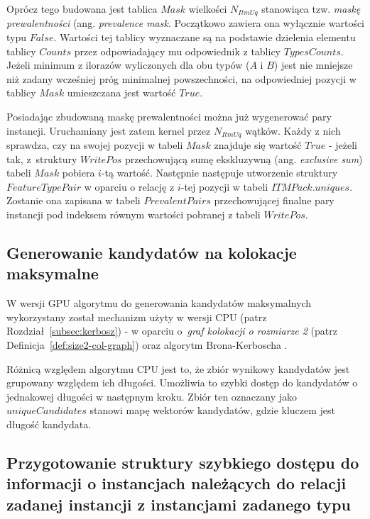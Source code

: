 \documentclass[12pt]{article}
\begin{document}
Oprócz tego budowana jest tablica $ Mask $ wielkości $ N_{ItmUq} $ stanowiąca tzw. \textit{maskę prewalentności} (ang. \textit{prevalence mask}. Początkowo zawiera ona wyłącznie wartości typu $ False $. Wartości tej tablicy wyznaczane są na podstawie dzielenia elementu tablicy $ Counts $ przez odpowiadający mu odpowiednik z tablicy $ TypesCounts $. Jeżeli minimum z ilorazów wyliczonych dla obu typów ($ A $ i $ B $) jest nie mniejsze niż zadany wcześniej próg minimalnej powszechności, na odpowiedniej pozycji w tablicy $ Mask $ umieszczana jest wartość $ True $.

Posiadając zbudowaną maskę prewalentności można już wygenerować pary instancji. Uruchamiany jest zatem kernel przez $ N_{ItmUq} $ wątków. Każdy z nich sprawdza, czy na swojej pozycji w tabeli $ Mask $ znajduje się wartość $ True $ - jeżeli tak, z~struktury $ WritePos $ przechowującą sumę ekskluzywną (ang. \textit{exclusive sum}) tabeli $ Mask $ pobiera $i$-tą wartość. Następnie następuje utworzenie struktury \linebreak $ FeatureTypePair $ w oparciu o relację z $ i $-tej pozycji w tabeli $ ITMPack.uniques$. Zostanie ona zapisana w tabeli $ PrevalentPairs $ przechowującej finalne pary instancji pod indeksem równym wartości pobranej z tabeli $ WritePos $.

\subsection{Generowanie kandydatów na kolokacje maksymalne}

W wersji GPU algorytmu do generowania kandydatów maksymalnych wykorzystany został mechanizm użyty w wersji CPU (patrz Rozdział~\ref{subsec:kerbosz}) -  w oparciu o~\textit{graf kolokacji o rozmiarze 2} (patrz Definicja~\ref{def:size2-col-graph}) oraz algorytm Brona-Kerboscha \cite{kerbosz}.

Różnicą względem algorytmu CPU jest to, że zbiór wynikowy kandydatów jest grupowany względem ich długości. Umożliwia to szybki dostęp do kandydatów o jednakowej długości w następnym kroku. Zbiór ten oznaczany jako $ uniqueCandidates $ stanowi mapę wektorów kandydatów, gdzie kluczem jest długość kandydata.

\subsection{Przygotowanie struktury szybkiego dostępu do informacji o instancjach należących do relacji zadanej instancji z instancjami zadanego typu}
\end{document}
